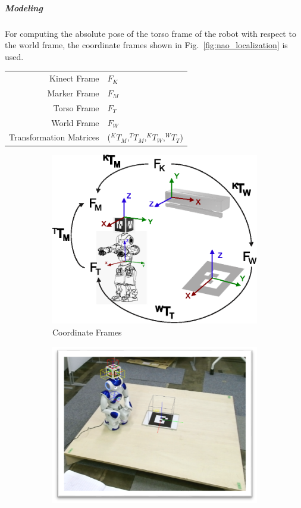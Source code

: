 \subparagraph{Modeling}
For computing the absolute pose of the torso frame of the robot with respect to the world frame, the coordinate frames shown in Fig.~\ref{fig:nao_localization} is used.

\begin{tabular}{r l}
\centering
  Kinect Frame & $F_K$ \\ 
  Marker Frame & $F_M$ \\ 
  Torso Frame & $F_T$ \\ 
  World Frame & $F_W$ \\ 
  Transformation Matrices  & ($^{K}T_M$,$^{T}T_M$,$^{K}T_W$,$^{W}T_T$) \\
\end{tabular}

\begin{figure}[H]
\centering
\begin{subfigure}[t]{0.48\textwidth}
\includegraphics[width=\textwidth]{../thesis/assets/localization_concept2.eps}
\caption[Modeling]{Coordinate Frames}
\label{fig:localize_frames}
\end{subfigure}
\begin{subfigure}[t]{0.48\textwidth}
\includegraphics[width=\textwidth]{../thesis/assets/localization_frames.png}

\end{subfigure}
\end{figure}
